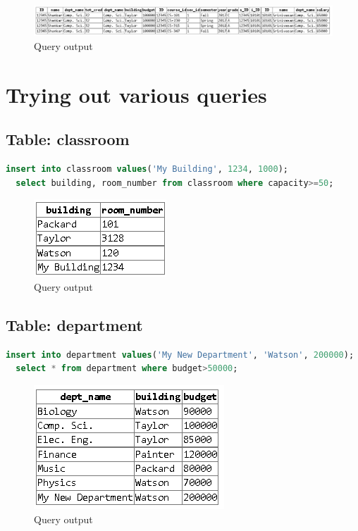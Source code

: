 \documentclass{article}
\begin{document}
\begin{figure}[!ht]
  \includegraphics[scale=0.61]{4.png}
  \caption{Query output}
\end{figure}




\section{Trying out various queries}

\subsection{Table: classroom}
\begin{lstlisting}[language=sql]
  insert into classroom values('My Building', 1234, 1000);
  select building, room_number from classroom where capacity>=50;
\end{lstlisting}
\begin{figure}[!ht]
  \begin{center}
  \includegraphics[scale=1]{class.png}
  \caption{Query output}
  \end{center}
\end{figure}

\subsection{Table: department}
\begin{lstlisting}[language=sql]
  insert into department values('My New Department', 'Watson', 200000);
  select * from department where budget>50000;
\end{lstlisting}
\begin{figure}[!ht]
  \begin{center}
  \includegraphics[scale=1]{dep.png}
  \caption{Query output}
  \end{center}
\end{figure}
\end{document}
